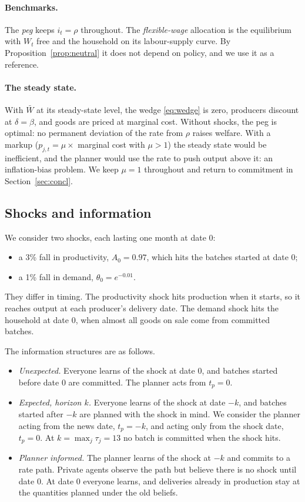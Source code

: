 \documentclass[11pt]{article}
\theoremstyle{definition}
\begin{document}
\paragraph{Benchmarks.} The \emph{peg} keeps $i_t=\rho$ throughout. The \emph{flexible-wage}
allocation is the equilibrium with $W_t$ free and the household on its labour-supply curve. By
Proposition~\ref{prop:neutral} it does not depend on policy, and we use it as a reference.

\paragraph{The steady state.} With $\bar W$ at its steady-state level, the wedge
\eqref{eq:wedge} is zero, producers discount at $\delta=\beta$, and goods are priced at marginal cost.
Without shocks, the peg is optimal: no permanent deviation of the rate from $\rho$ raises welfare. With
a markup ($p_{j,t}=\mu\times$ marginal cost with $\mu>1$) the steady state would be inefficient, and the
planner would use the rate to push output above it: an inflation-bias problem. We keep $\mu=1$
throughout and return to commitment in Section~\ref{sec:concl}.

\subsection{Shocks and information}\label{sec:info_struct}

We consider two shocks, each lasting one month at date 0:
\begin{itemize}
  \item a 3\% fall in productivity, $A_0=0.97$, which hits the batches started at date 0;
  \item a 1\% fall in demand, $\theta_0=e^{-0.01}$.
\end{itemize}
They differ in timing. The productivity shock hits production when it starts, so it reaches output
at each producer's delivery date. The demand shock hits the household at date 0, when almost all
goods on sale come from committed batches.

The information structures are as follows.
\begin{itemize}
  \item \emph{Unexpected.} Everyone learns of the shock at date 0, and batches started before date 0
        are committed. The planner acts from $t_p=0$.
  \item \emph{Expected, horizon $k$.} Everyone learns of the shock at date $-k$, and batches started
        after $-k$ are planned with the shock in mind. We consider the planner acting from the news
        date, $t_p=-k$, and acting only from the shock date, $t_p=0$. At $k=\max_j\tau_j=13$ no batch
        is committed when the shock hits.
  \item \emph{Planner informed.} The planner learns of the shock at $-k$ and commits to a rate path.
        Private agents observe the path but believe there is no shock until date 0. At date 0 everyone
        learns, and deliveries already in production stay at the quantities planned under the old
        beliefs.
\end{itemize}
\end{document}
